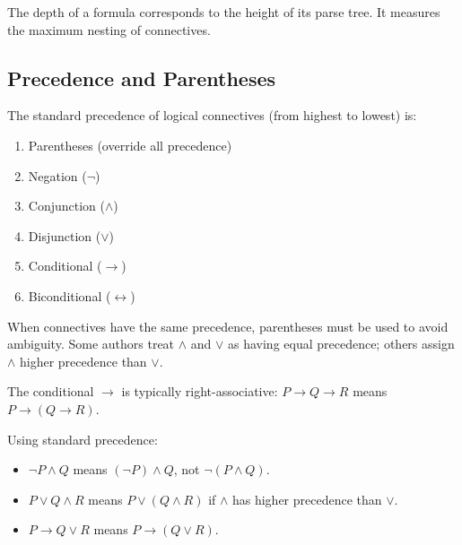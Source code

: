\begin{remark}
The depth of a formula corresponds to the height of its parse tree. It measures
the maximum nesting of connectives.
\end{remark}

\subsection{Precedence and Parentheses}

\begin{definition}
The standard precedence of logical connectives (from highest to lowest) is:
\begin{enumerate}
  \item Parentheses (override all precedence)
  \item Negation ($\neg$)
  \item Conjunction ($\wedge$)
  \item Disjunction ($\vee$)
  \item Conditional ($\rightarrow$)
  \item Biconditional ($\leftrightarrow$)
\end{enumerate}
\end{definition}

\begin{remark}
When connectives have the same precedence, parentheses must be used to avoid
ambiguity. Some authors treat $\wedge$ and $\vee$ as having equal precedence;
others assign $\wedge$ higher precedence than $\vee$.

The conditional $\rightarrow$ is typically right-associative:
$P \rightarrow Q \rightarrow R$ means $P \rightarrow (Q \rightarrow R)$.
\end{remark}

\begin{example}
Using standard precedence:
\begin{itemize}
  \item $\neg P \wedge Q$ means $(\neg P) \wedge Q$, not $\neg(P \wedge Q)$.
  \item $P \vee Q \wedge R$ means $P \vee (Q \wedge R)$ if $\wedge$ has higher
        precedence than $\vee$.
  \item $P \rightarrow Q \vee R$ means $P \rightarrow (Q \vee R)$.
\end{itemize}
\end{example}

